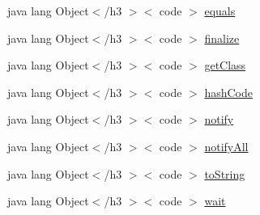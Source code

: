 \begin{DoxyCompactItemize}
\item 
java lang Object$<$/h3 $>$$<$ code $>$ \hyperlink{_r_8attr_8html_a8974318cea585f72df717e0380ec7104}{equals}
\item 
java lang Object$<$/h3 $>$$<$ code $>$ \hyperlink{_r_8attr_8html_ab2315181ead4aeedef2374039b6ddde7}{finalize}
\item 
java lang Object$<$/h3 $>$$<$ code $>$ \hyperlink{_r_8attr_8html_a98e6644727fe65eac217a6855045be43}{get\-Class}
\item 
java lang Object$<$/h3 $>$$<$ code $>$ \hyperlink{_r_8attr_8html_a8e178e2bb2bef055ea23ea3910a221ca}{hash\-Code}
\item 
java lang Object$<$/h3 $>$$<$ code $>$ \hyperlink{_r_8attr_8html_ae99ae10b5010594dbda4794e02db271b}{notify}
\item 
java lang Object$<$/h3 $>$$<$ code $>$ \hyperlink{_r_8attr_8html_a1279357e6e09e33e75b55eb05fdb6436}{notify\-All}
\item 
java lang Object$<$/h3 $>$$<$ code $>$ \hyperlink{_r_8attr_8html_a36e8a76a4132c9a7081416f27d087615}{to\-String}
\item 
java lang Object$<$/h3 $>$$<$ code $>$ \hyperlink{_r_8attr_8html_a9a9f0c22e5688d478c707f910f1c1aea}{wait}
\end{DoxyCompactItemize}


